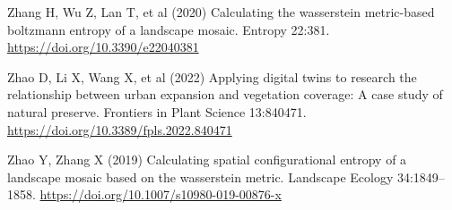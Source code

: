 \documentclass[
  10pt,
  a4paperpaper,
]{article}
\newlength{\cslhangindent}
\newenvironment{CSLReferences}[2] %
 {\begin{list}{}{%
  \setlength{\itemindent}{0pt}
  \setlength{\leftmargin}{0pt}
  \setlength{\parsep}{0pt}
  \ifodd #1
   \setlength{\leftmargin}{\cslhangindent}
   \setlength{\itemindent}{-1\cslhangindent}
  \fi
  \setlength{\itemsep}{#2\baselineskip}}}
 {\end{list}}
\begin{document}
\begin{CSLReferences}{1}{1}
Zhang H, Wu Z, Lan T, et al (2020) Calculating the wasserstein
metric-based boltzmann entropy of a landscape mosaic. Entropy 22:381.
\url{https://doi.org/10.3390/e22040381}

Zhao D, Li X, Wang X, et al (2022) Applying digital twins to research
the relationship between urban expansion and vegetation coverage: A case
study of natural preserve. Frontiers in Plant Science 13:840471.
\url{https://doi.org/10.3389/fpls.2022.840471}

Zhao Y, Zhang X (2019) Calculating spatial configurational entropy of a
landscape mosaic based on the wasserstein metric. Landscape Ecology
34:1849--1858. \url{https://doi.org/10.1007/s10980-019-00876-x}

\end{CSLReferences}

\endgroup
\end{document}
